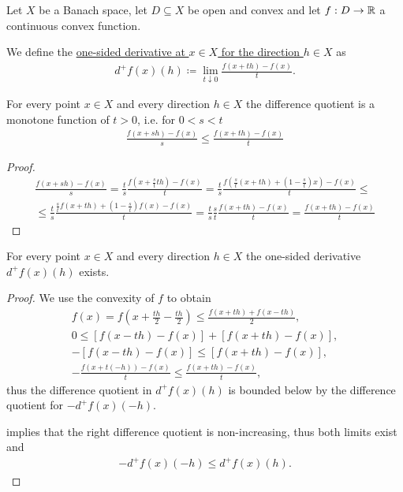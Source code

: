 Let $X$ be a Banach space, let $D \subseteq X$ be open and convex and let $f: D \to \mathbb{R}$ a continuous convex function.

\begin{definition}
  We define the \uline{one-sided derivative at $x \in X$ for the direction $h \in X$} as
  \begin{align*}
    d^+ f(x)(h) \coloneqq \lim_{t \downarrow 0} \frac {f(x + th) - f(x)} t.
  \end{align*}
\end{definition}

\begin{lemma}
  \label{thm:analysis:convex:difference-quotient-grows}
  For every point $x \in X$ and every direction $h \in X$ the difference quotient is a monotone function of $t > 0$, i.e. for $0 < s < t$
  \begin{align*}
    \frac {f(x + sh) - f(x)} s
    \leq
    \frac {f(x + th) - f(x)} t
  \end{align*}
\end{lemma}
\begin{proof}
  \begin{align*}
    \frac {f(x + sh) - f(x)} s
    =
    \frac t s \frac {f(x + \frac s t t h) - f(x)} t
    =
    \frac t s \frac {f\left(\frac s t (x + th) + (1 - \frac s t) x \right) - f(x)} t
    \leq \\ \leq
    \frac t s \frac {\frac s t f(x + t h) + (1 - \frac s t) f(x) - f(x)} t
    =
    \frac t s \frac s t \frac {f(x + th) - f(x)} t
    =
    \frac {f(x + th) - f(x)} t
  \end{align*}
\end{proof}

\begin{proposition}
  \label{thm:analysis:convex:one-sided-derivatives-exist}
  For every point $x \in X$ and every direction $h \in X$ the one-sided derivative $d^+ f(x)(h)$ exists.
\end{proposition}
\begin{proof}
  We use the convexity of $f$ to obtain
  \begin{align*}
    f(x) = f \left(x + \frac {th} 2 - \frac {th} 2 \right) \leq \frac {f(x + th) + f(x - th)} 2,
    \\
    0 \leq [f(x - th) - f(x)] + [f(x + th) - f(x)],
    \\
    -[f(x - th) - f(x)] \leq [f(x + th) - f(x)],
    \\
    -\frac {f(x + t(-h)) - f(x)} t \leq \frac {f(x + th) - f(x)} t,
  \end{align*}
  thus the difference quotient in $d^+ f(x)(h)$ is bounded below by the difference quotient for $-d^+ f(x)(-h)$.

   implies that the right difference quotient is non-increasing, thus both limits exist and
  \begin{align*}
    -d^+ f(x)(-h) \leq d^+ f(x)(h).
  \end{align*}
\end{proof}

